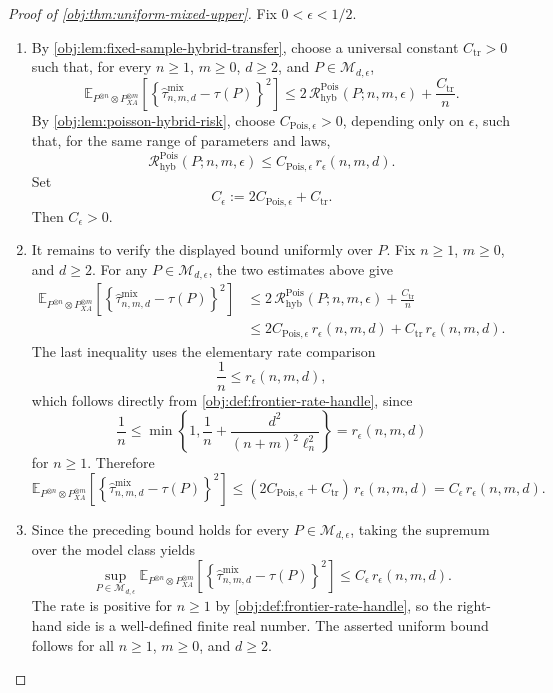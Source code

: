 \documentclass[11pt]{article}
\begin{document}
\begin{proof}[Proof of \cref{obj:thm:uniform-mixed-upper}]
Fix \(0<\epsilon<1/2\).

\begin{enumerate}
\item By \cref{obj:lem:fixed-sample-hybrid-transfer}, choose a universal constant \(C_{\mathrm{tr}}>0\) such that, for every \(n\ge1\), \(m\ge0\), \(d\ge2\), and \(P\in\mathcal M_{d,\epsilon}\),
\[
\mathbb E_{P^{\otimes n}\otimes P_{XA}^{\otimes m}}
\!\left[
\left\{\widehat\tau^{\mathrm{mix}}_{n,m,d}-\tau(P)\right\}^2
\right]
\le
2\,\mathcal R^{\mathrm{Pois}}_{\mathrm{hyb}}(P;n,m,\epsilon)
+\frac{C_{\mathrm{tr}}}{n}.
\]
By \cref{obj:lem:poisson-hybrid-risk}, choose \(C_{\mathrm{Pois},\epsilon}>0\), depending only on \(\epsilon\), such that, for the same range of parameters and laws,
\[
\mathcal R^{\mathrm{Pois}}_{\mathrm{hyb}}(P;n,m,\epsilon)
\le
C_{\mathrm{Pois},\epsilon}\,r_\epsilon(n,m,d).
\]
Set
\[
C_\epsilon:=2C_{\mathrm{Pois},\epsilon}+C_{\mathrm{tr}}.
\]
Then \(C_\epsilon>0\). %

\item It remains to verify the displayed bound uniformly over \(P\). Fix \(n\ge1\), \(m\ge0\), and \(d\ge2\). For any \(P\in\mathcal M_{d,\epsilon}\), the two estimates above give
\[
\begin{aligned}
\mathbb E_{P^{\otimes n}\otimes P_{XA}^{\otimes m}}
\!\left[
\left\{\widehat\tau^{\mathrm{mix}}_{n,m,d}-\tau(P)\right\}^2
\right]
&\le
2\,\mathcal R^{\mathrm{Pois}}_{\mathrm{hyb}}(P;n,m,\epsilon)
+\frac{C_{\mathrm{tr}}}{n}  \\
&\le
2C_{\mathrm{Pois},\epsilon}\,r_\epsilon(n,m,d)
+C_{\mathrm{tr}}\,r_\epsilon(n,m,d).
\end{aligned}
\]
The last inequality uses the elementary rate comparison
\[
\frac1n\le r_\epsilon(n,m,d),
\]
which follows directly from \cref{obj:def:frontier-rate-handle}, since
\[
\frac1n
\le
\min\!\left\{
1,\frac1n+\frac{d^2}{(n+m)^2\ell_n^2}
\right\}
=
r_\epsilon(n,m,d)
\]
for \(n\ge1\). Therefore
\[
\mathbb E_{P^{\otimes n}\otimes P_{XA}^{\otimes m}}
\!\left[
\left\{\widehat\tau^{\mathrm{mix}}_{n,m,d}-\tau(P)\right\}^2
\right]
\le
(2C_{\mathrm{Pois},\epsilon}+C_{\mathrm{tr}})\,r_\epsilon(n,m,d)
=
C_\epsilon\,r_\epsilon(n,m,d).
\] %

\item Since the preceding bound holds for every \(P\in\mathcal M_{d,\epsilon}\), taking the supremum over the model class yields
\[
\sup_{P\in\mathcal M_{d,\epsilon}}
\mathbb E_{P^{\otimes n}\otimes P_{XA}^{\otimes m}}
\!\left[
\left\{\widehat\tau^{\mathrm{mix}}_{n,m,d}-\tau(P)\right\}^2
\right]
\le
C_\epsilon\,r_\epsilon(n,m,d).
\]
The rate is positive for \(n\ge1\) by \cref{obj:def:frontier-rate-handle}, so the right-hand side is a well-defined finite real number. The asserted uniform bound follows for all \(n\ge1\), \(m\ge0\), and \(d\ge2\). %
\end{enumerate}
\end{proof}
\end{document}
